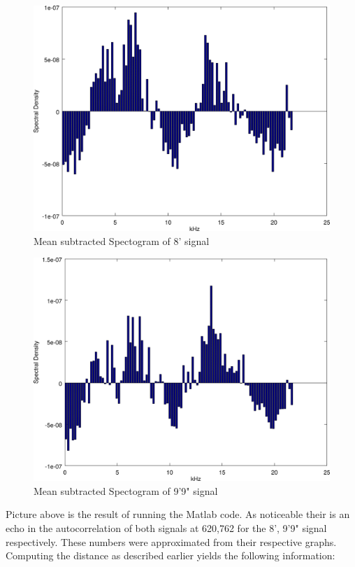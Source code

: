 \documentclass{article}
\begin{document}
      \begin{figure}[H]
         \includegraphics[width=\textheight/2]{images/spec_8.png}
         \caption{Mean subtracted Spectogram of 8' signal}
      \end{figure}
      \begin{figure}[H]
         \includegraphics[width=\textheight/2]{images/spec_9.png}
         \caption{Mean subtracted Spectogram of 9'9" signal}
      \end{figure}
      Picture above is the result of running the Matlab code.
      As noticeable their is an echo in the autocorrelation of both signals
      at {620,762} for the {8', 9'9"} signal respectively. These
      numbers were approximated from their respective graphs. Computing the
      distance as described earlier yields the following information:
\end{document}

